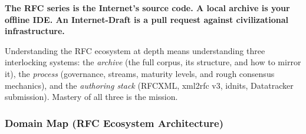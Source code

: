 \documentclass[11pt,letterpaper]{article}
\begin{document}
\textbf{The RFC series is the Internet's source code. A local archive is your offline IDE. An Internet-Draft is a pull request against civilizational infrastructure.}

Understanding the RFC ecosystem at depth means understanding three interlocking systems: the \textit{archive} (the full corpus, its structure, and how to mirror it), the \textit{process} (governance, streams, maturity levels, and rough consensus mechanics), and the \textit{authoring stack} (RFCXML, xml2rfc v3, idnits, Datatracker submission). Mastery of all three is the mission.

\subsubsection{Domain Map (RFC Ecosystem Architecture)}
\end{document}
